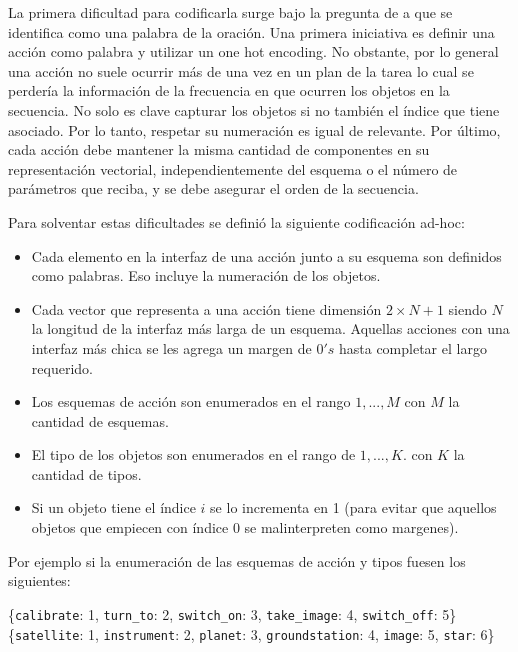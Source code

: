 La primera dificultad para codificarla surge bajo la pregunta de a que se
identifica como una palabra de la oración. Una primera iniciativa es definir una
acción como palabra y utilizar un one hot encoding. No obstante, por lo general
una acción no suele ocurrir más de una vez en un plan de la tarea lo cual se
perdería la información de la frecuencia en que ocurren los objetos en la
secuencia. No solo es clave capturar los objetos si no también el índice que tiene asociado. Por lo tanto, respetar su numeración es igual de relevante. Por
último, cada acción debe mantener la misma cantidad de componentes en su
representación vectorial, independientemente del esquema o el número de
parámetros que reciba, y se debe asegurar el orden de la secuencia.

Para solventar estas dificultades se definió la siguiente codificación ad-hoc:

\begin{itemize}
    \item Cada elemento en la interfaz de una acción junto a su esquema son
    definidos como palabras. Eso incluye la numeración de los objetos.
    \item Cada vector que representa a una acción tiene dimensión $2 \times N +
    1$ siendo $N$ la longitud de la interfaz más larga de un esquema. Aquellas
    acciones con una interfaz más chica se les agrega un margen de $0's$ hasta
    completar el largo requerido.
    \item Los esquemas de acción son enumerados en el rango $1, ..., M$ con $M$
    la cantidad de esquemas.
    \item El tipo de los objetos son enumerados en el rango de $1, ..., K$. con
    $K$ la cantidad de tipos.
    \item Si un objeto tiene el índice $i$ se lo incrementa en 1 (para evitar que
    aquellos objetos que empiecen con índice 0 se malinterpreten como margenes).
\end{itemize}

Por ejemplo si la enumeración de las esquemas de acción y tipos fuesen los siguientes:

\begin{center}
    \{\verb|calibrate|: 1, \verb|turn_to|: 2, \verb|switch_on|: 3, \verb|take_image|: 4, \verb|switch_off|: 5\} \\
    \{\verb|satellite|: 1, \verb|instrument|: 2, \verb|planet|: 3, \verb|groundstation|: 4, \verb|image|: 5, \verb|star|: 6\}
\end{center}

